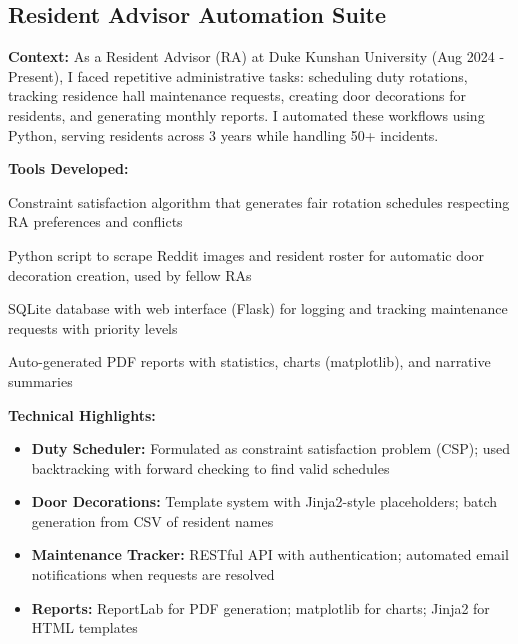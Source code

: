 
\subsection*{Resident Advisor Automation Suite}

\textbf{Context:} As a Resident Advisor (RA) at Duke Kunshan University (Aug 2024 - Present), I faced repetitive administrative tasks: scheduling duty rotations, tracking residence hall maintenance requests, creating door decorations for residents, and generating monthly reports. I automated these workflows using Python, serving residents across 3 years while handling 50+ incidents.

\vspace{0.5em}

\textbf{Tools Developed:}

\begin{description}[leftmargin=4em, labelwidth=3.5em, labelsep=0.5em]
  \item[Duty Scheduler:] Constraint satisfaction algorithm that generates fair rotation schedules respecting RA preferences and conflicts
  \item[Door Decor Generator:] Python script to scrape Reddit images and resident roster for automatic door decoration creation, used by fellow RAs
  \item[Maintenance Tracker:] SQLite database with web interface (Flask) for logging and tracking maintenance requests with priority levels
  \item[Monthly Reports:] Auto-generated PDF reports with statistics, charts (matplotlib), and narrative summaries
\end{description}

\vspace{0.5em}

\textbf{Technical Highlights:}

\begin{itemize}[leftmargin=1.2em, itemsep=0.1em]
  \item \textbf{Duty Scheduler:} Formulated as constraint satisfaction problem (CSP); used backtracking with forward checking to find valid schedules
  \item \textbf{Door Decorations:} Template system with Jinja2-style placeholders; batch generation from CSV of resident names
  \item \textbf{Maintenance Tracker:} RESTful API with authentication; automated email notifications when requests are resolved
  \item \textbf{Reports:} ReportLab for PDF generation; matplotlib for charts; Jinja2 for HTML templates
\end{itemize}

